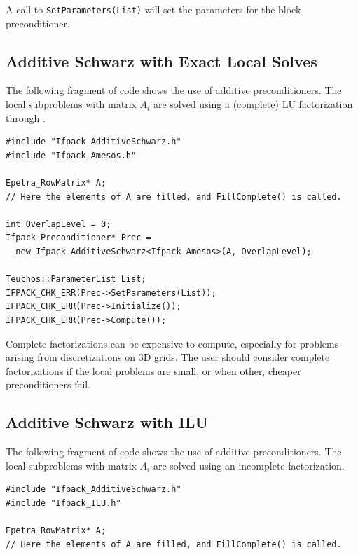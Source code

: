 {A call to \verb!SetParameters(List)! will set the parameters for the block
preconditioner.

\subsection{Additive Schwarz with Exact Local Solves}
\label{sec:as_amesos}

The following fragment of code shows the use of additive preconditioners. The
local subproblems with matrix $A_i$ are solved using a (complete) LU
factorization through \amesos.
\begin{verbatim}
#include "Ifpack_AdditiveSchwarz.h"
#include "Ifpack_Amesos.h"

Epetra_RowMatrix* A;
// Here the elements of A are filled, and FillComplete() is called.

int OverlapLevel = 0;
Ifpack_Preconditioner* Prec = 
  new Ifpack_AdditiveSchwarz<Ifpack_Amesos>(A, OverlapLevel);

Teuchos::ParameterList List;
IFPACK_CHK_ERR(Prec->SetParameters(List));
IFPACK_CHK_ERR(Prec->Initialize());
IFPACK_CHK_ERR(Prec->Compute());
\end{verbatim}

\begin{remark}
Complete factorizations can be expensive to compute, especially for problems
arising from discretizations on 3D grids. The user should consider complete
factorizations if the local problems are small, or when other, cheaper
preconditioners fail.
\end{remark}

\subsection{Additive Schwarz with ILU}
\label{sec:as_ilu}

The following fragment of code shows the use of additive preconditioners. The
local subproblems with matrix $A_i$ are solved using an incomplete
factorization.
\begin{verbatim}
#include "Ifpack_AdditiveSchwarz.h"
#include "Ifpack_ILU.h"

Epetra_RowMatrix* A;
// Here the elements of A are filled, and FillComplete() is called.


\end{verbatim}}
